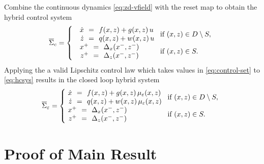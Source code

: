 \documentclass[twocolumn]{article}
\begin{document}
Combine the continuous dynamics \eqref{eq:zd-vfield} with the reset map to obtain the hybrid control system
\begin{align}
  \label{eq:hcsys}
        \HCSbar= \left\{
        \begin{array}{l l}
          \begin{array}{r c l}
            {\dot \zdx} &\!\!=\!\!& f(\zdx, \zdz) + g(\zdx, \zdz) \, u\\
            {\dot \zdz} &\!\!=\!\!& q(\zdx, \zdz) + w(\zdx, \zdz) \, u
          \end{array} \!\! & \!\! \mbox{if } (\zdx, \zdz) \in \D \setminus \S,\\
          \begin{array}{r c l}
            \zdx^{+} &\!\!=\!\!& \Delta_{\zdx}(\zdx^{-}, \zdz^{-})\\
            \zdz^{+} &\!\!=\!\!& \Delta_{\zdz}(\zdx^{-}, \zdz^{-})
          \end{array} \!\! & \!\! \mbox{if } (\zdx, \zdz) \in \S.
        \end{array}\right.
\end{align}
%
Applying the a valid Lipschitz control law which takes values in \eqref{eq:control-set} to \eqref{eq:hcsys} results in the closed loop hybrid system
%
\begin{align}
  \label{eq:hsys-cl}
        \HSbar_{\resclfparam} = \left\{\!\!\!\!
        \begin{array}{l l}
          \begin{array}{r c l}
            {\dot \zdx} &\!\!=\!\!& f(\zdx, \zdz) + g(\zdx, \zdz) \, \mueps(\zdx, \zdz)\\
            {\dot \zdz} &\!\!=\!\!& q(\zdx, \zdz) + w(\zdx, \zdz) \, \mueps(\zdx, \zdz)
          \end{array} \!\! & \!\! \mbox{if } (\zdx, \zdz) \in \D \setminus \S,\\
          \begin{array}{r c l}
            \zdx^{+} &\!\!=\!\!& \Delta_{\zdx}(\zdx^{-}, \zdz^{-})\\
            \zdz^{+} &\!\!=\!\!& \Delta_{\zdz}(\zdx^{-}, \zdz^{-})
          \end{array} \!\! & \!\! \mbox{if } (\zdx, \zdz) \in \S.
        \end{array}\right.
\end{align}

\section{Proof of Main Result}
\end{document}

